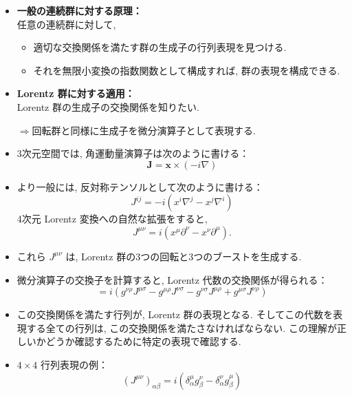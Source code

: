 \documentclass[a4paper,12pt]{article}
\begin{document}
\begin{itemize}
  \item \textbf{一般の連続群に対する原理：}\\
  任意の連続群に対して,
  \begin{itemize}
    \item 適切な交換関係を満たす群の生成子の行列表現を見つける.
    \item それを無限小変換の指数関数として構成すれば, 群の表現を構成できる.
  \end{itemize} 
  \item \textbf{Lorentz 群に対する適用：}\\
  Lorentz 群の生成子の交換関係を知りたい.\par
  $\Longrightarrow$回転群と同様に生成子を微分演算子として表現する.
  \item 3次元空間では, 角運動量演算子は次のように書ける：
  \begin{equation*}
    \mathbf{J} = \mathbf{x} \times (-i\nabla) \tag{3.15}
  \end{equation*}
  \item より一般には, 反対称テンソルとして次のように書ける：
  \begin{equation*}
    J^{ij} = -i(x^i \nabla^j - x^j \nabla^i)
  \end{equation*}
  4次元 Lorentz 変換への自然な拡張をすると,
  \begin{equation*}
    J^{\mu\nu} = i(x^\mu \partial^\nu - x^\nu \partial^\mu). \tag{3.16}
  \end{equation*}
  \item これら $J^{\mu\nu}$ は, Lorentz 群の3つの回転と3つのブーストを生成する.
  \item 微分演算子の交換子を計算すると, Lorentz 代数の交換関係が得られる：
  \begin{equation*}
    [J^{\mu\nu}, J^{\rho\sigma}] = i \left( g^{\nu\rho} J^{\mu\sigma}
      - g^{\mu\rho} J^{\nu\sigma}
      - g^{\nu\sigma} J^{\mu\rho}
      + g^{\mu\sigma} J^{\nu\rho} \right) \label{3.17}\tag{3.17}
  \end{equation*}
  \item この交換関係を満たす行列が, Lorentz 群の表現となる. そしてこの代数を表現する全ての行列は, この交換関係を満たさなければならない. この理解が正しいかどうか確認するために特定の表現で確認する.
  \item $4 \times 4$ 行列表現の例：
  \begin{equation*}
  (J^{\mu\nu})_{\alpha\beta} = i(\delta^\mu_\alpha g^\nu_\beta - \delta^\nu_\alpha g^\mu_\beta) \label{3.18}\tag{3.18}
  \end{equation*}

\end{itemize}
\end{document}
